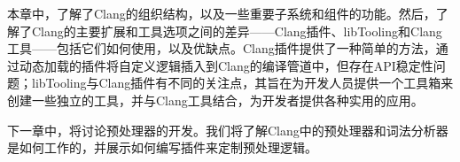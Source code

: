 本章中，了解了Clang的组织结构，以及一些重要子系统和组件的功能。然后，了解了Clang的主要扩展和工具选项之间的差异——Clang插件、libTooling和Clang工具——包括它们如何使用，以及优缺点。Clang插件提供了一种简单的方法，通过动态加载的插件将自定义逻辑插入到Clang的编译管道中，但存在API稳定性问题；libTooling与Clang插件有不同的关注点，其旨在为开发人员提供一个工具箱来创建一些独立的工具，并与Clang工具结合，为开发者提供各种实用的应用。

下一章中，将讨论预处理器的开发。我们将了解Clang中的预处理器和词法分析器是如何工作的，并展示如何编写插件来定制预处理逻辑。